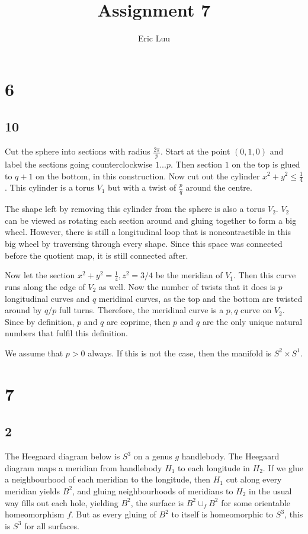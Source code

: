 \documentclass{article}
\title{Assignment 7}
\author{Eric Luu}
\theoremstyle{definition}
\numberwithin{theorem}{section}
\numberwithin{equation}{section}
\begin{document}
\section{6}
\subsection{10}

Cut the sphere into sections with radius $\frac{2\pi}{p}$. Start at the point $(0, 1, 0)$ and label the sections going counterclockwise $1 ... p$. Then section $1$ on the top is glued to $q + 1$ on the bottom, in this construction. Now cut out the cylinder $x^2 + y^2 \leq \frac{1}{4}$. This cylinder is a torus $V_1$ but with a twist of $\frac{p}{q}$ around the centre.

The shape left by removing this cylinder from the sphere is also a torus $V_2$. $V_2$ can be viewed as rotating each section around and gluing together to form a big wheel. However, there is still a longitudinal loop that is noncontractible in this big wheel by traversing through every shape. Since this space was connected before the quotient map, it is still connected after. 

Now let the section $x^2 + y^2 = \frac{1}{4}, z^2 = 3/4$ be the meridian of $V_1$. Then this curve runs along the edge of $V_2$ as well. Now the number of twists that it does is $p$ longitudinal curves and $q$ meridinal curves, as the top and the bottom are twisted around by $q/p$ full turns. Therefore, the meridinal curve is a $p, q$ curve on $V_2$. Since by definition, $p$ and $q$ are coprime, then $p$ and $q$ are the only unique natural numbers that fulfil this definition. 

We assume that $p > 0$ always. If this is not the case, then the manifold is $S^2 \times S^1$. 
\section{7}

\subsection{2}
The Heegaard diagram below is $S^3$ on a genus $g$ handlebody. The Heegaard diagram maps a meridian from handlebody $H_1$ to each longitude in $H_2$. If we glue a neighbourhood of each meridian to the longitude, then $H_1$ cut along every meridian yields $B^2$, and gluing neighbourhoods of meridians to $H_2$ in the usual way fills out each hole, yielding $B^2$, the surface is $B^2 \cup_f B^2$ for some orientable homeomorphism $f$. But as every gluing of $B^2$ to itself is homeomorphic to $S^3$, this is $S^3$ for all surfaces. 
\begin{figure}[h]
    
\end{figure}
\end{document}
